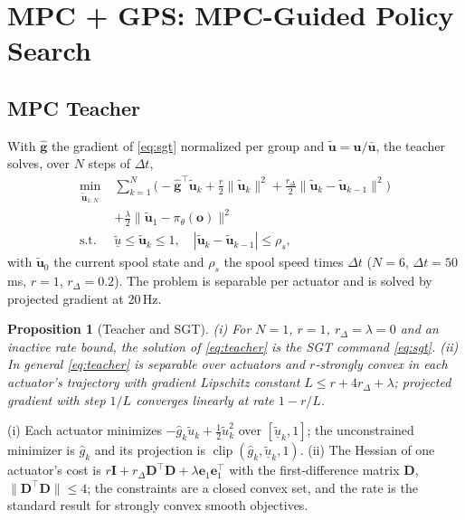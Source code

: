 \documentclass[letterpaper,10pt,conference]{IEEEtran}
\newcommand{\vect}[1]{\boldsymbol{#1}}
\newtheorem{proposition}{Proposition}
\DeclareMathOperator{\clip}{clip}
\begin{document}
\section{MPC + GPS: MPC-Guided Policy Search}\label{sec:gps}

\subsection{MPC Teacher}
With $\hat{\vect g}$ the gradient of \eqref{eq:sgt} normalized per
group and $\tilde{\vect u}=\vect u/\bar{\vect u}$, the teacher solves,
over $N$ steps of $\Delta t$,
\begin{equation}
\begin{aligned}
\min_{\tilde{\vect u}_{1:N}}\;&\textstyle\sum_{k=1}^{N}\big(-\hat{\vect g}^\top\tilde{\vect u}_k
+\tfrac r2\|\tilde{\vect u}_k\|^2+\tfrac{r_\Delta}{2}\|\tilde{\vect u}_k-\tilde{\vect u}_{k-1}\|^2\big)\\
&+\tfrac{\lambda}{2}\|\tilde{\vect u}_1-\pi_\theta(\vect o)\|^2\\
\text{s.t.}\;&\underline{\tilde u}\le\tilde{\vect u}_k\le1,\quad
|\tilde{\vect u}_k-\tilde{\vect u}_{k-1}|\le\rho_s,
\end{aligned}
\label{eq:teacher}
\end{equation}
with $\tilde{\vect u}_0$ the current spool state and $\rho_s$ the spool
speed times $\Delta t$ ($N=6$, $\Delta t=50$\,ms, $r=1$,
$r_\Delta=0.2$). The problem is separable per actuator and is solved by
projected gradient at 20\,Hz.

\begin{proposition}[Teacher and SGT]\label{prop:teacher}
(i) For $N=1$, $r=1$, $r_\Delta=\lambda=0$ and an inactive rate bound,
the solution of \eqref{eq:teacher} is the SGT command \eqref{eq:sgt}.
(ii) In general \eqref{eq:teacher} is separable over actuators and
$r$-strongly convex in each actuator's trajectory with gradient
Lipschitz constant $L\le r+4r_\Delta+\lambda$; projected gradient with
step $1/L$ converges linearly at rate $1-r/L$.
\end{proposition}
\begin{IEEEproof}
(i) Each actuator minimizes $-\hat g_k\tilde u_k+\tfrac12\tilde u_k^2$
over $[\underline{\tilde u}_k,1]$; the unconstrained minimizer is
$\hat g_k$ and its projection is $\clip(\hat g_k,\underline{\tilde u}_k,1)$.
(ii) The Hessian of one actuator's cost is
$r\vect I+r_\Delta\vect D^\top\vect D+\lambda\vect e_1\vect e_1^\top$ with
the first-difference matrix $\vect D$, $\|\vect D^\top\vect D\|\le4$; the
constraints are a closed convex set, and the rate is the standard
result for strongly convex smooth objectives.
\end{IEEEproof}
\end{document}
